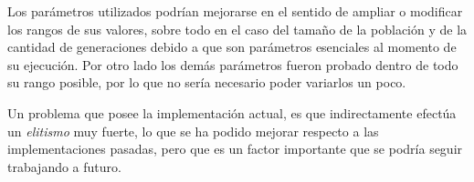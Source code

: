 Los parámetros utilizados podrían mejorarse en el sentido de  ampliar o modificar los rangos de sus valores, sobre todo
en el caso del tamaño de la población y de la cantidad de generaciones debido a que son parámetros esenciales al momento
de su ejecución. Por otro lado los demás parámetros fueron probado dentro de todo su rango posible, por lo que no sería
necesario poder variarlos un poco.

Un problema que posee la implementación actual, es que indirectamente efectúa un \emph{elitismo} muy fuerte, lo que se ha
podido mejorar respecto a las implementaciones pasadas, pero que es un factor importante que se podría seguir trabajando a futuro.


